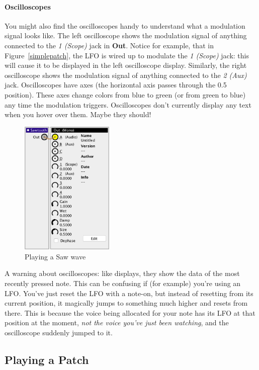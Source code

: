 \documentclass{article}
\begin{document}
\paragraph{Oscilloscopes}
You might also find the oscilloscopes handy to understand what a modulation signal looks like.  The left oscilloscope shows the modulation signal of anything connected to the {\it 1 (Scope)} jack in {\bf Out}.  Notice for example, that in Figure~\ref{simplepatch}, the LFO is wired up to modulate the {\it 1 (Scope)} jack: this will cause it to be displayed in the left oscilloscope display.  Similarly, the right oscilloscope shows the modulation signal of anything connected to the {\it 2 (Aux)} jack.  Oscilloscopes have axes (the horizontal axis passes through the 0.5 position).  These axes change colors from blue to green (or from green to blue) any time the modulation triggers.  Oscilloscopes don't currently display any text when you hover over them.  Maybe they should!

\begin{figure}
\vspace{-1em}
\includegraphics[width=1.75in]{simple}
\caption{Playing a Saw wave}
\vspace{-2em}
\label{simple}
\end{figure}

A warning about oscilloscopes: like displays, they show the data of the most recently pressed note.  This can be confusing if (for example) you're using an LFO.  You've just reset the LFO with a note-on, but instead of resetting from its current position, it magically jumps to something much higher and resets from there.  This is because the voice being allocated for your note has its LFO at that position at the moment, {\it not the voice you've just been watching}, and the oscilloscope suddenly jumped to it.

\subsection{Playing a Patch}
\label{playingapatch}
\end{document}
